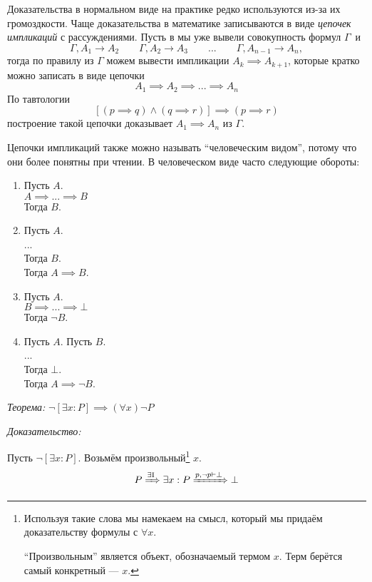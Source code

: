 Доказательства в нормальном виде на практике редко используются из-за их
громоздкости.
Чаще доказательства в математике записываются в виде {\it цепочек импликаций}
с рассуждениями.
Пусть в мы уже вывели совокупность формул $\Gamma$~и
\[
	\Gamma,A_1\to A_2\qquad \Gamma,A_2\to A_3
	\qquad  ... \qquad \Gamma,A_{n-1}\to A_{n},
\]
тогда по правилу \implic{} из $\Gamma$ можем вывести импликации
${A_{k}\implies A_{k+1}}$, которые кратко можно записать в виде цепочки
\[
	A_1\implies A_2\implies ...\implies A_{n}
\]
По тавтологии
\[
	[(p\implies q)\land (q\implies r)]\implies (p\implies r)
\]
построение такой цепочки доказывает $A_1\implies A_{n}$ из $\Gamma$.

Цепочки импликаций также можно называть ``человеческим видом'', потому что они более
понятны при чтении.
В человеческом виде часто следующие обороты:
\begin{fullwidth}
	\begin{multicols}{4}
		\begin{enumerate}[label=(\roman*)]
			\item{}
			Пусть $A$.\\
			$A\implies...\implies B$\\
			Тогда $B$.
			\item{}
			Пусть $A$.\\
			...\\
			Тогда $B$.\\
			Тогда $A\implies B$.
			\item{}
			Пусть $A$.\\
			$B\implies ...\implies \bot$\\
			Тогда $\lnot B$.
			\item{}
			Пусть $A$. Пусть $B$.\\
			...\\
			Тогда $\bot$.\\
			Тогда $A\implies \lnot B$.
		\end{enumerate}
	\end{multicols}
\end{fullwidth}

{\it Теорема:} $\lnot[\exists x:P]\implies (\forall x)\lnot P$

{\it Доказательство:}

Пусть ${\lnot[\exists x:P]}$.
Возьмём произвольный\footnote{
	Используя такие слова мы намекаем на смысл, который мы придаём доказательству
	формулы с $\forall x$.

	``Произвольным'' является объект, обозначаемый термом $x$.
	Терм берётся самый конкретный --- $x$.
} $x$.
\[
	P\xRightarrow{\text{$\exists$I}} \exists x:P
	\xRightarrow{p,\lnot p\vdash\bot} \bot
\]

